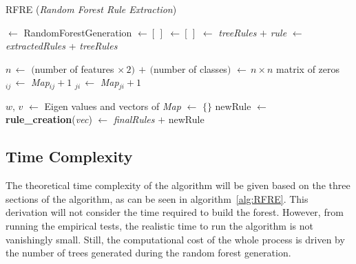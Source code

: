 \documentclass[11pt]{article}
\begin{document}
\begin{algorithm}[!ht]
\caption{RFRE (\textit{Random Forest Rule Extraction})}\label{alg:RFRE}
\begin{algorithmic}[1]
 $\gets$ RandomForestGeneration		
 $\gets [\, ]$
	  $\gets [\,]$
		 $\gets$ {\sl treeRules} $+$ {\sl rule} 
	\EndFor
	 $\gets$ {\sl extractedRules} + {\sl treeRules}
\EndFor

\State $n \, \gets$ $($number of features $\times \, 2) \, + \,($number of classes$)$ 
 $\gets \, n\times n$ matrix of zeros
		$_{ij} \, \gets$  {\sl Map}$_{ij} + 1$
		$_{ji} \, \gets$  {\sl Map}$_{ji} + 1$
	\EndIf
\EndFor

\State $w, \, v$ $\gets$ Eigen values and vectors of {\sl Map}
 $\gets$ $\{\}$
	\State newRule $\gets $ \textbf{rule\_creation}({\sl  vec})
	 $\gets$ {\sl finalRules} $+$ newRule
	\EndIf
\EndFor
\State {}
\end{algorithmic}
\end{algorithm}

\subsection{Time Complexity}
The theoretical time complexity of the algorithm will be given based on the three sections of the algorithm, as can be seen in algorithm~\ref{alg:RFRE}. This derivation will not consider the time required to build the forest. However, from running the empirical tests, the realistic time to run the algorithm is not vanishingly small. Still, the computational cost of the whole process is driven by the number of trees generated during the random forest generation.
\end{document}
